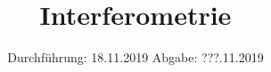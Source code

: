 

\subject{Versuch 64}
\title{Interferometrie}
\date{%
  Durchführung: 18.11.2019
  \hspace{3em}
  Abgabe: ???.11.2019
}



\maketitle
\thispagestyle{empty}
\tableofcontents
\newpage






\printbibliography{}



